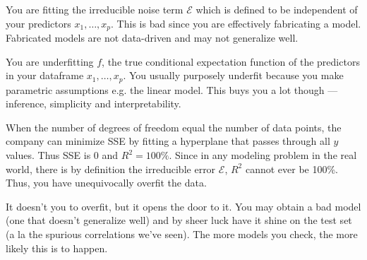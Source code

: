 \documentclass[12pt]{article}
\newcommand{\errorrv}{\mathcal{E}}
\begin{document}
\begin{enumerate}


You are fitting the irreducible noise term $\errorrv$ which is defined to be independent of your predictors $x_1, \ldots, x_p$. This is bad since you are effectively fabricating a model. Fabricated models are not data-driven and may not generalize well.


You are underfitting $f$, the true conditional expectation function of the predictors in your dataframe $x_1, \ldots, x_p$. You usually purposely underfit because you make parametric assumptions e.g. the linear model. This buys you a lot though --- inference, simplicity and interpretability.


When the number of degrees of freedom equal the number of data points, the company can minimize SSE by fitting a hyperplane that passes through all $y$ values. Thus SSE is 0 and $R^2 = 100\%$. Since in any modeling problem in the real world, there is by definition the irreducible error $\errorrv$, $R^2$ cannot ever be 100\%. Thus, you have unequivocally overfit the data.



It doesn't  you to overfit, but it opens the door to it. You may obtain a bad model (one that doesn't generalize well) and by sheer luck have it shine on the test set (a la the spurious correlations we've seen). The more models you check, the more likely this is to happen.

\end{enumerate}
\end{document}
